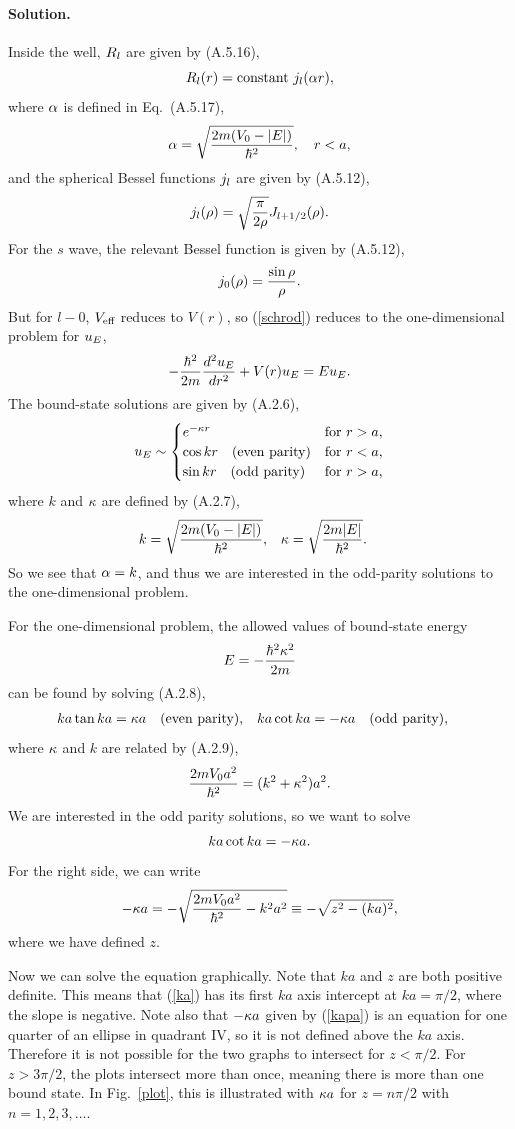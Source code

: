 \documentclass[11pt]{article}
\newcommand{\refeq}[1]{(\ref{#1})}
\newcommand{\beq}{\begin{equation*}}
\newcommand{\eeq}{\end{equation*}}
\newcommand{\beqn}{\begin{equation}}
\newcommand{\eeqn}{\end{equation}}
\newenvironment{solution}
{
	\paragraph{Solution.}
}
{
	\bigskip
}
\begin{document}
\begin{solution}
	Inside the well, $R_l$ are given by (A.5.16),
	\beq
		\Rl(r) = \constant \jl(\alp r),
	\eeq
	where $\alpha$ is defined in Eq.~(A.5.17),
	\beq
		\alp = \sqrt{\frac{2m (\Vo - \abs{E})}{\hbar^2}}, \quad r < a,
	\eeq
	\clearpage
	and the spherical Bessel functions $j_l$ are given by (A.5.12),
	\begin{align*}
		j_l(\rho) = \sqrt{\frac{\pi}{2\rho}} J_{l + 1/2}(\rho).
	\end{align*}
	For the $s$ wave, the relevant Bessel function is given by (A.5.12),
	\beqn \label{jo}
		\jo(\rho) = \frac{\sin\rho}{\rho}.
	\eeqn
	But for $l - 0$, $V_{\text{eff}}$ reduces to $V(r)$, so \refeq{schrod} reduces to the one-dimensional problem for $u_E$,
	\beq
		-\frac{\hbar^2}{2m} \dv[2]{\uE}{r} + V(r) \uE = E \uE.
	\eeq
	The bound-state solutions are given by (A.2.6),
	\beq
		\uE \sim \begin{cases}
			e^{-\kap r} & \text{for } r > a, \\
			\cos kr \quad \text{(even parity)} & \text{for } r < a, \\
			\sin kr \quad \text{(odd parity)} & \text{for } r > a,
		\end{cases}
	\eeq
	where $k$ and $\kappa$ are defined by (A.2.7),
	\begin{align*}
		k &= \sqrt{\frac{2m (V_0 - \abs{E})}{\hbar^2}}, &
		\kappa &= \sqrt{\frac{2m \abs{E}}{\hbar^2}}.
	\end{align*}
	So we see that $\alpha = k$, and thus we are interested in the odd-parity solutions to the one-dimensional problem.
	
	For the one-dimensional problem, the allowed values of bound-state energy
	\beq
		E = -\frac{\hbar^2 \kap^2}{2m}
	\eeq
	can be found by solving (A.2.8),
	\begin{align*}
		k a \tan k a &= \kappa a \quad\text{(even parity)}, &
		k a \cot k a &= -\kappa a \quad\text{(odd parity)},
	\end{align*}
	where $\kappa$ and $k$ are related by (A.2.9),
	\beq
		\frac{2 m \Vo a^2}{\hbar^2} = (k^2 + \kap^2) a^2.
	\eeq
	We are interested in the odd parity solutions, so we want to solve
	\beqn \label{ka}
		k a \cot k a = -\kap a.
	\eeqn
	For the right side, we can write
	\beqn \label{kapa}
		-\kap a = -\sqrt{\frac{2 m \Vo a^2}{\hbar^2} - k^2 a^2} \equiv -\sqrt{z^2 - (ka)^2},
	\eeqn
	where we have defined $z$.
	
	Now we can solve the equation graphically.  Note that $ka$ and $z$ are both positive definite. This means that \refeq{ka} has its first $ka$ axis intercept at $ka = \pi/2$, where the slope is negative.  Note also that $-\kappa a$ given by \refeq{kapa} is an equation for one quarter of an ellipse in quadrant IV, so it is not defined above the $ka$ axis.  Therefore it is not possible for the two graphs to intersect for $z < \pi / 2$.  For $z > 3\pi / 2$, the plots intersect more than once, meaning there is more than one bound state.  In Fig.~\ref{plot}, this is illustrated with $\kappa a$ for $z = n \pi / 2$ with $n = 1, 2, 3, \ldots$.
	

\end{solution}
\end{document}
